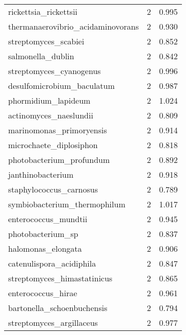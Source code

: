 \begin{tabular}{lrr}
                       rickettsia\_rickettsii &                   2 &     0.995 \\
           thermanaerovibrio\_acidaminovorans &                   2 &     0.930 \\
                        streptomyces\_scabiei &                   2 &     0.852 \\
                           salmonella\_dublin &                   2 &     0.842 \\
                     streptomyces\_cyanogenus &                   2 &     0.996 \\
                  desulfomicrobium\_baculatum &                   2 &     0.987 \\
                         phormidium\_lapideum &                   2 &     1.024 \\
                      actinomyces\_naeslundii &                   2 &     0.809 \\
                    marinomonas\_primoryensis &                   2 &     0.914 \\
                     microchaete\_diplosiphon &                   2 &     0.818 \\
                    photobacterium\_profundum &                   2 &     0.892 \\
                           janthinobacterium &                   2 &     0.918 \\
                     staphylococcus\_carnosus &                   2 &     0.789 \\
                symbiobacterium\_thermophilum &                   2 &     1.017 \\
                        enterococcus\_mundtii &                   2 &     0.945 \\
                           photobacterium\_sp &                   2 &     0.837 \\
                          halomonas\_elongata &                   2 &     0.906 \\
                    catenulispora\_acidiphila &                   2 &     0.847 \\
                 streptomyces\_himastatinicus &                   2 &     0.865 \\
                          enterococcus\_hirae &                   2 &     0.961 \\
                  bartonella\_schoenbuchensis &                   2 &     0.794 \\
                    streptomyces\_argillaceus &                   2 &     0.977 \\

\end{tabular}
